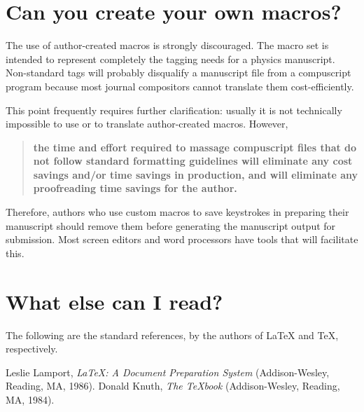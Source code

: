\section{Can you create your own macros?}

The use of author-created macros is strongly discouraged. The \REVTeX{}
macro set is intended to represent completely the tagging needs for a
physics manuscript. Non-standard tags will probably disqualify a manuscript
file from a compuscript program because most journal compositors cannot
translate them cost-efficiently.

This point frequently requires further clarification: usually it is not
technically impossible to use or to translate author-created macros.
However,

\begin{quote}
{\bf the time and effort required to massage compuscript files that do not
follow standard formatting guidelines will eliminate any cost savings
and/or time savings in production, and will eliminate any proofreading time
savings for the author.}
\end{quote}


Therefore, authors who use custom macros to save keystrokes in preparing
their manuscript should remove them before generating the manuscript output
for submission.  Most screen editors and word processors have tools that
will facilitate this.


\section{What else can I read?}

The following are the standard references, by the authors of \LaTeX{} and
\TeX{}, respectively.


\begin{references}
Leslie Lamport, {\it \LaTeX: A Document Preparation
System} (Addison-Wesley, Reading, MA, 1986).
Donald Knuth, {\it The \TeX book} (Addison-Wesley,
Reading, MA, 1984).
\end{references}

